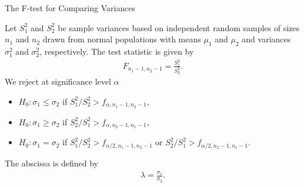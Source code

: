 \begin{frame}{The F-test for Comparing Variances}

\justifying
{} Let $S_1^2$ and $S_2^2$ be sample variances based on independent random samples of sizes $n_1$ and $n_2$ drawn from normal populations with means $\mu_1$ and $\mu_2$ and variances $\sigma_1^2$ and $\sigma_2^2$, respectively. The test statistic is given by
\begin{align*}
F_{n_1-1,n_2-1} = \frac{S_1^2}{S_2^2}.
\end{align*}
We reject at significance level $\alpha$
\begin{itemize}
	\justifying
	\item $H_0: \sigma_1 \leq \sigma_2$ if $S_1^2/S_2^2 > f_{\alpha, n_1-1, n_2-1}$,
	\item $H_0: \sigma_1 \geq \sigma_2$ if $S_2^2/S_1^2 > f_{\alpha, n_2-1, n_1-1}$,
	\item $H_0: \sigma_1 = \sigma_2$ if $S_1^2/S_2^2 > f_{\alpha/2, n_1-1, n_2-1}$ or $S_2^2/S_1^2 > f_{\alpha/2, n_2-1, n_1-1}$.
\end{itemize}
 The abscissa is defined by
\begin{align*}
\lambda = \frac{\sigma_1}{\sigma_2}.
\end{align*}

\end{frame}
